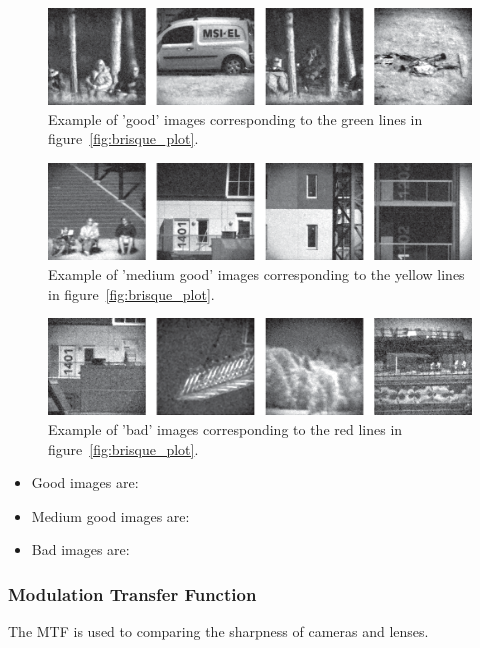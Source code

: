\begin{figure}[H]
    \centering
    \includegraphics[width = 1\linewidth]{result/SPC_NRQA/good.eps}
    \caption{Example of 'good' images corresponding to the green lines in figure~\ref{fig:brisque_plot}.}
    \label{fig:good_plot}
\end{figure}

\begin{figure}[H]
    \centering
    \includegraphics[width = 1\linewidth]{result/SPC_NRQA/half.eps}
    \caption{Example of 'medium good' images corresponding to the yellow lines in figure~\ref{fig:brisque_plot}.}
    \label{fig:half_plot}
\end{figure}

\begin{figure}[H]
    \centering
    \includegraphics[width = 1\linewidth]{result/SPC_NRQA/bad.eps}
    \caption{Example of 'bad' images corresponding to the red lines in figure~\ref{fig:brisque_plot}.}
    \label{fig:bad_plot}
\end{figure}

\begin{itemize}
    \item Good images are:
    \item Medium good images are:
    \item Bad images are:
\end{itemize}


\subsubsection{Modulation Transfer Function}
The MTF is used to comparing the sharpness of cameras and lenses.  

